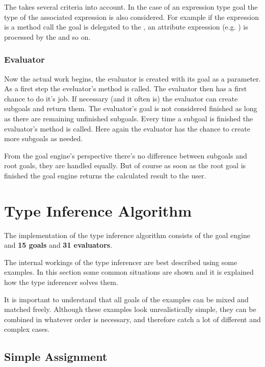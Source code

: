 \documentclass[12pt,halfparskip,DIV11,BCOR10mm]{scrreprt}
\begin{document}
The  takes several criteria into account. In the case of an expression type goal the type of the associated expression is also considered. For example if the expression is a method call the goal is delegated to the , an attribute expression (e.g. ) is processed by the  and so on.

\subsubsection{Evaluator}

Now the actual work begins, the evaluator is created with its goal as a parameter. As a first step the eveluator's  method is called. The evaluator then has a first chance to do it's job. If necessary (and it often is) the evaluator can create subgoals and return them. The evaluator's goal is not considered finished as long as there are remaining unfinished subgoals. Every time a subgoal is finished the evaluator's  method is called. Here again the evaluator has the chance to create more subgoals as needed.

From the goal engine's perspective there's no difference between subgoals and root goals, they are handled equally. But of course as soon as the root goal is finished the goal engine returns the calculated result to the user.
    
\section{Type Inference Algorithm}

The implementation of the type inference algorithm consists of the goal engine and \textbf{15 goals} and \textbf{31 evaluators}.

The internal workings of the type inferencer are best described using some examples. In this section some common situations are shown and it is explained how the type inferencer solves them.

It is important to understand that all goals of the examples can be mixed and matched freely. Although these examples look unrealistically simple, they can be combined in whatever order is necessary, and therefore catch a lot of different and complex cases.


\subsection{Simple Assignment}
\end{document}

